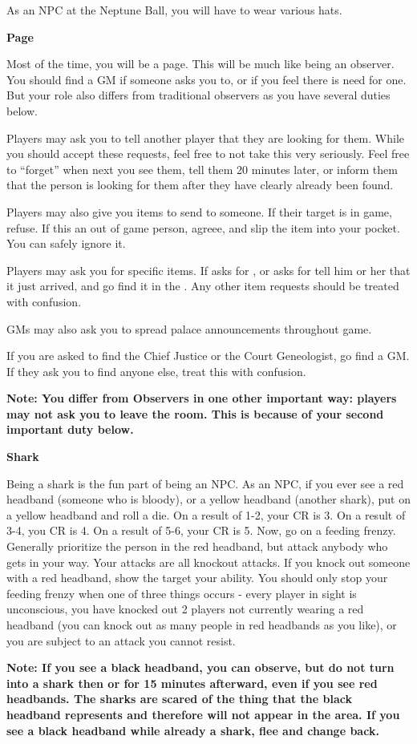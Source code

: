 \documentclass[green]{NeptuneBall}
\begin{document}
\name{\gNPC{}}

As an NPC at the Neptune Ball, you will have to wear various hats.

{\bf Page}

Most of the time, you will be a page. This will be much like being an observer. You should find a GM if someone asks you to, or if you feel there is need for one. But your role also differs from traditional observers as you have several duties below.

Players may ask you to tell another player that they are looking for them. While you should accept these requests, feel free to not take this very seriously. Feel free to "`forget"' when next you see them, tell them 20 minutes later, or inform them that the person is looking for them after they have clearly already been found. 

Players may also give you items to send to someone. If their target is in game, refuse. If this an out of game person, agreee, and slip the item into your pocket. You can safely ignore it.

Players may ask you for specific items. If \cPriest{} asks for \iCipherLetter{}, or \cSpy{} asks for \iScroll{} tell him or her that it just arrived, and go find it in the \pGM{}. Any other item requests should be treated with confusion.

GMs may also ask you to spread palace announcements throughout game.

If you are asked to find the Chief Justice or the Court Geneologist, go find a GM. If they ask you to find anyone else, treat this with confusion.

{\bf Note: You differ from Observers in one other important way: players may not ask you to leave the room. This is because of your second important duty below.}

{\bf Shark}

Being a shark is the fun part of being an NPC. As an NPC, if you ever see a red headband (someone who is bloody), or a yellow headband (another shark), put on a yellow headband and roll a die. On a result of 1-2, your CR is 3. On a result of 3-4, you CR is 4. On a result of 5-6, your CR is 5. Now, go on a feeding frenzy. Generally prioritize the person in the red headband, but attack anybody who gets in your way. Your attacks are all knockout attacks. If you knock out someone with a red headband, show the target your \aShark{} ability. You should only stop your feeding frenzy when one of three things occurs - every player in sight is unconscious, you have knocked out 2 players not currently wearing a red headband (you can knock out as many people in red headbands as you like), or you are subject to an attack you cannot resist. 

{\bf Note: If you see a black headband, you can observe, but do not turn into a shark then or for 15 minutes afterward, even if you see red headbands. The sharks are scared of the thing that the black headband represents and therefore will not appear in the area. If you see a black headband while already a shark, flee and change back.}
\end{document}

